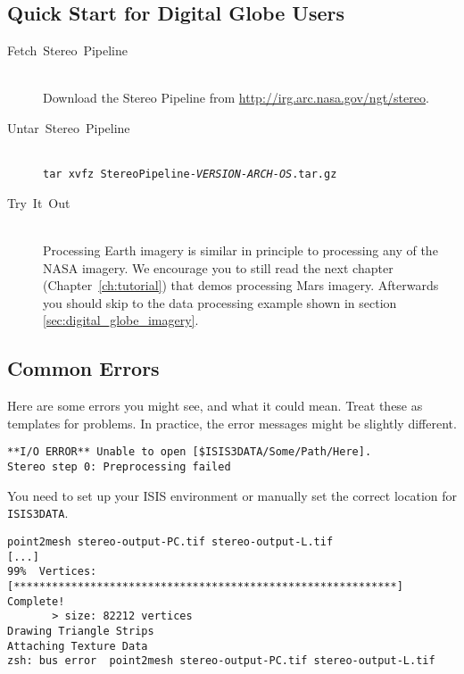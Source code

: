 \subsection{Quick Start for Digital Globe Users}
\label{quickstartDG}
\begin{description}

\item[{Fetch~Stereo~Pipeline}] ~\\
Download the Stereo Pipeline from \url{http://irg.arc.nasa.gov/ngt/stereo}.

\item[{Untar~Stereo~Pipeline}] ~\\
\texttt{tar xvfz StereoPipeline-\textit{VERSION-ARCH-OS}.tar.gz}

\item [{Try~It~Out}] ~\\
Processing Earth imagery is similar in principle to processing any of
the NASA imagery. We encourage you to still read the next chapter
(Chapter~\ref{ch:tutorial}) that demos processing Mars
imagery. Afterwards you should skip to the data processing example
shown in section \ref{sec:digital_globe_imagery}.

\end{description}

\subsection{Common Errors}

Here are some errors you might see, and what it could mean. Treat
these as templates for problems.  In practice, the error messages might
be slightly different.

\begin{verbatim}
**I/O ERROR** Unable to open [$ISIS3DATA/Some/Path/Here].
Stereo step 0: Preprocessing failed
\end{verbatim}

You need to set up your ISIS environment or manually set the correct
location for \texttt{ISIS3DATA}.

\begin{verbatim}
point2mesh stereo-output-PC.tif stereo-output-L.tif
[...]
99%  Vertices:   [************************************************************] Complete!
       > size: 82212 vertices
Drawing Triangle Strips
Attaching Texture Data
zsh: bus error  point2mesh stereo-output-PC.tif stereo-output-L.tif
\end{verbatim}


